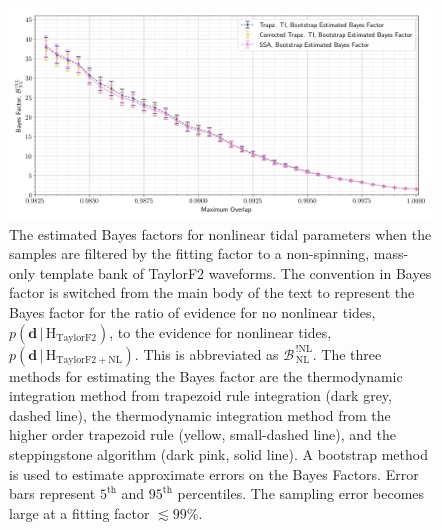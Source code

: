 \begin{figure}[th]
\includegraphics[width=\columnwidth]{figs/chapter6/bootstrap_bayes_ff_cuts_average}\caption{The estimated Bayes factors for nonlinear tidal parameters when the samples are filtered by the fitting factor to a non-spinning, mass-only template bank of TaylorF2 waveforms. The convention in Bayes factor is switched from the main body of the text to represent the Bayes factor for the ratio of evidence for no nonlinear tides, $p\left(\mathbf{d}\,|\, \mathrm{H}_\mathrm{TaylorF2}\right)$, to the evidence for nonlinear tides, $p\left(\mathbf{d}\,|\,\mathrm{H}_\mathrm{TaylorF2+NL}\right)$. This is abbreviated as $\mathcal{B}^{\,\mathrm{!NL}}_{\,\mathrm{NL}}$. The three methods for estimating the Bayes factor are the thermodynamic integration method from trapezoid rule integration (dark grey, dashed line), the thermodynamic integration method from the higher order trapezoid rule (yellow, small-dashed line), and the steppingstone algorithm (dark pink, solid line). A bootstrap method is used to estimate approximate errors on the Bayes Factors. Error bars represent $5^{\mathrm{th}}$ and $95^{\mathrm{th}}$ percentiles. The sampling error becomes large at a fitting factor $\lesssim 99$\%.
}
\label{fig:bayes_ff_plot}
\end{figure}

